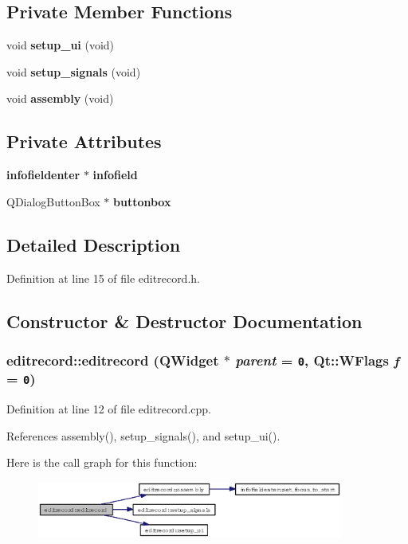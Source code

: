 \subsection*{Private Member Functions}
\begin{CompactItemize}
\item 
void {\bf setup\_\-ui} (void)
\item 
void {\bf setup\_\-signals} (void)
\item 
void {\bf assembly} (void)
\end{CompactItemize}
\subsection*{Private Attributes}
\begin{CompactItemize}
\item 
{\bf infofieldenter} $\ast$ {\bf infofield}
\item 
QDialog\-Button\-Box $\ast$ {\bf buttonbox}
\end{CompactItemize}


\subsection{Detailed Description}




Definition at line 15 of file editrecord.h.

\subsection{Constructor \& Destructor Documentation}
\subsubsection{\setlength{\rightskip}{0pt plus 5cm}editrecord::editrecord (QWidget $\ast$ {\em parent} = {\tt 0}, Qt::WFlags {\em f} = {\tt 0})}\label{classeditrecord_854413f1af75438302e9e242b3c4a130}




Definition at line 12 of file editrecord.cpp.

References assembly(), setup\_\-signals(), and setup\_\-ui().

Here is the call graph for this function:\begin{figure}[H]
\begin{center}
\leavevmode
\includegraphics[width=285pt]{classeditrecord_854413f1af75438302e9e242b3c4a130_cgraph}
\end{center}
\end{figure}
